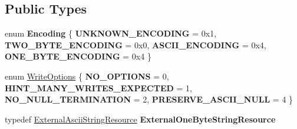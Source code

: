 \subsection*{Public Types}
\begin{DoxyCompactItemize}
\item 
\hypertarget{classv8_1_1_string_a2f4a2e9516c246eef602b889ce049c49}{}enum {\bfseries Encoding} \{ {\bfseries U\+N\+K\+N\+O\+W\+N\+\_\+\+E\+N\+C\+O\+D\+I\+N\+G} = 0x1, 
{\bfseries T\+W\+O\+\_\+\+B\+Y\+T\+E\+\_\+\+E\+N\+C\+O\+D\+I\+N\+G} = 0x0, 
{\bfseries A\+S\+C\+I\+I\+\_\+\+E\+N\+C\+O\+D\+I\+N\+G} = 0x4, 
{\bfseries O\+N\+E\+\_\+\+B\+Y\+T\+E\+\_\+\+E\+N\+C\+O\+D\+I\+N\+G} = 0x4
 \}\label{classv8_1_1_string_a2f4a2e9516c246eef602b889ce049c49}

\item 
enum \hyperlink{classv8_1_1_string_a9ce7f1458ffd08f8eb2b9c8dc056e616}{Write\+Options} \{ {\bfseries N\+O\+\_\+\+O\+P\+T\+I\+O\+N\+S} = 0, 
{\bfseries H\+I\+N\+T\+\_\+\+M\+A\+N\+Y\+\_\+\+W\+R\+I\+T\+E\+S\+\_\+\+E\+X\+P\+E\+C\+T\+E\+D} = 1, 
{\bfseries N\+O\+\_\+\+N\+U\+L\+L\+\_\+\+T\+E\+R\+M\+I\+N\+A\+T\+I\+O\+N} = 2, 
{\bfseries P\+R\+E\+S\+E\+R\+V\+E\+\_\+\+A\+S\+C\+I\+I\+\_\+\+N\+U\+L\+L} = 4
 \}
\item 
\hypertarget{classv8_1_1_string_aefa36d4416f7f2b0c415dfa2d225e728}{}typedef \hyperlink{classv8_1_1_string_1_1_external_ascii_string_resource}{External\+Ascii\+String\+Resource} {\bfseries External\+One\+Byte\+String\+Resource}\label{classv8_1_1_string_aefa36d4416f7f2b0c415dfa2d225e728}

\end{DoxyCompactItemize}
